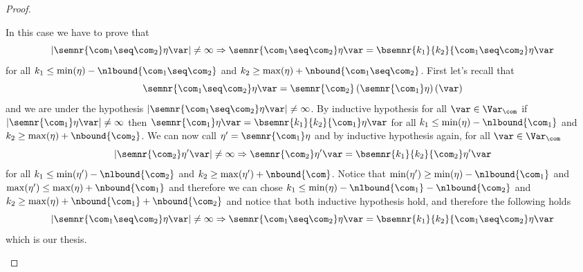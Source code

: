 \begin{proof}
\begin{inductive}
     In this case we have to prove that
    \begin{equation*}
      |\semnr{\com_1\seq\com_2}\eta\var| \neq \infty \Rightarrow \semnr{\com_1 \seq\com_2} \eta\var = \bsemnr{k_1}{k_2}{\com_1 \seq\com_2}\eta\var
    \end{equation*}
    for all \(k_1 \leq \min(\eta) -\nlbound{\com_1\seq\com_2}\) and
    \(k_2 \geq \max(\eta) + \nbound{\com_1\seq\com_2}\). First let's
    recall that
    \begin{equation*}
      \semnr{\com_1\seq\com_2}\eta\var = \semnr{\com_2}\left(\semnr{\com_1}\eta\right)(\var)
    \end{equation*}
    and we are under the hypothesis
    \(|\semnr{\com_1\seq\com_2}\eta\var| \neq \infty\). By inductive
    hypothesis for all \(\var \in \Var_{\com}\) if
    \(|\semnr{\com_1}\eta\var| \neq \infty\) then
    \(\semnr{\com_1}\eta\var = \bsemnr{k_1}{k_2}{\com_1}\eta\var\) for
    all \(k_1 \leq \min(\eta) - \nlbound{\com_1}\) and
    \(k_2 \geq \max(\eta) + \nbound{\com_2}\). We can now call
    \(\eta' = \semnr{\com_1}\eta\) and by inductive hypothesis again,
    for all \(\var\in\Var_{\com}\)
    \begin{equation*}
      |\semnr{\com_2}\eta'\var| \neq \infty \Rightarrow \semnr{\com_2}\eta'\var = \bsemnr{k_1}{k_2}{\com_2}\eta'\var
    \end{equation*}
    for all \(k_1 \leq \min(\eta') - \nlbound{\com_2}\) and
    \(k_2 \geq \max(\eta') + \nbound{\com}\). Notice that
    \(\min(\eta') \geq \min(\eta) - \nlbound{\com_1}\) and
    \(\max(\eta') \leq \max(\eta) + \nbound{\com_1}\) and therefore we
    can chose
    \(k_1 \leq \min(\eta) - \nlbound{\com_1} - \nlbound{\com_2}\) and
    \(k_2 \geq \max(\eta) + \nbound{\com_1} + \nbound{\com_2}\) and
    notice that both inductive hypothesis hold, and therefore the
    following holds
    \begin{equation*}
      |\semnr{\com_1\seq\com_2}\eta\var| \neq \infty \Rightarrow \semnr{\com_1\seq\com_2}\eta\var = \bsemnr{k_1}{k_2}{\com_1\seq\com_2}\eta\var
    \end{equation*}
    which is our thesis.
    

\end{inductive}
\end{proof}
